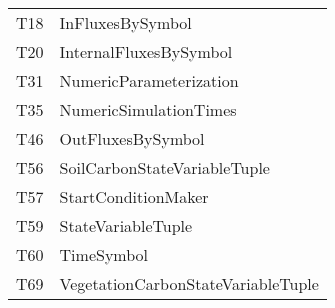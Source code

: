 \begin{tabular}{l l}
	T18 	 & 	InFluxesBySymbol\\
	T20 	 & 	InternalFluxesBySymbol\\
	T31 	 & 	NumericParameterization\\
	T35 	 & 	NumericSimulationTimes\\
	T46 	 & 	OutFluxesBySymbol\\
	T56 	 & 	SoilCarbonStateVariableTuple\\
	T57 	 & 	StartConditionMaker\\
	T59 	 & 	StateVariableTuple\\
	T60 	 & 	TimeSymbol\\
	T69 	 & 	VegetationCarbonStateVariableTuple
\end{tabular}